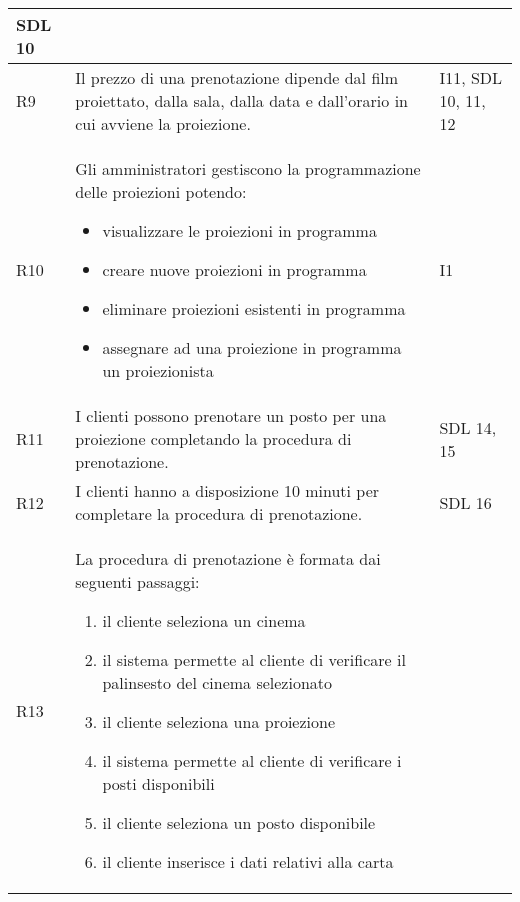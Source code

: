 \begin{longtable}{|p{0.8cm}|p{13.4cm}|p{2.1cm}|}
      SDL 10
      \\\hline
      R9                                                                      &
      Il prezzo di una prenotazione dipende dal film proiettato, dalla
      sala, dalla data e dall'orario in cui avviene la proiezione.            &
      I11, SDL 10, 11, 12
      \\\hline
      R10                                                                     &
      Gli amministratori gestiscono la programmazione delle proiezioni
      potendo:
      \begin{itemize}
            \item visualizzare le proiezioni in programma
            \item creare nuove proiezioni in programma
            \item eliminare proiezioni esistenti in programma
            \item assegnare ad una proiezione in programma un proiezionista
      \end{itemize}         &
      I1
      \\\hline
      R11                                                                     &
      I clienti possono prenotare un posto per una proiezione completando
      la procedura di prenotazione.                                           &
      SDL 14, 15
      \\\hline
      R12                                                                     &
      I clienti hanno a disposizione 10 minuti per completare la procedura
      di prenotazione.                                                        &
      SDL 16
      \\\hline
      R13                                                                     &
      La procedura di prenotazione è formata dai seguenti passaggi:
      \begin{enumerate}
            \item il cliente seleziona un cinema
            \item il sistema permette al cliente di verificare
                  il palinsesto del cinema selezionato
            \item il cliente seleziona una proiezione
            \item il sistema permette al cliente di verificare
                  i posti disponibili
            \item il cliente seleziona un posto disponibile
            \item il cliente inserisce i dati relativi alla carta

\end{enumerate}
\end{longtable}
